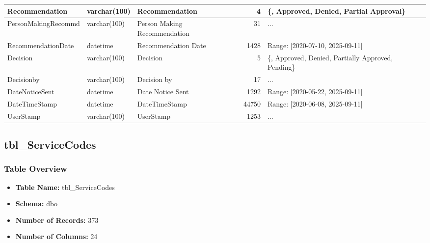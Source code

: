 \begin{landscape}
\begin{longtable}{|l|l|l|r|p{6cm}|}
\hline
Recommendation & varchar(100) & Recommendation & 4 & \{, Approved, Denied, Partial Approval\} \\
\hline
PersonMakingRecommd & varchar(100) & Person Making Recommendation & 31 & ... \\
\hline
RecommendationDate & datetime & Recommendation Date & 1428 & Range: [2020-07-10, 2025-09-11] \\
\hline
Decision & varchar(100) & Decision & 5 & \{, Approved, Denied, Partially Approved, Pending\} \\
\hline
Decisionby & varchar(100) & Decision by & 17 & ... \\
\hline
DateNoticeSent & datetime & Date Notice Sent & 1292 & Range: [2020-05-22, 2025-09-11] \\
\hline
DateTimeStamp & datetime & DateTimeStamp & 44750 & Range: [2020-06-08, 2025-09-11] \\
\hline
UserStamp & varchar(100) & UserStamp & 1253 & ... \\
\hline
\end{longtable}

\subsection{tbl\_ServiceCodes}

\subsubsection{Table Overview}
\begin{itemize}
\item \textbf{Table Name:} tbl\_ServiceCodes
\item \textbf{Schema:} dbo
\item \textbf{Number of Records:} 373
\item \textbf{Number of Columns:} 24
\end{itemize}


\end{landscape}
